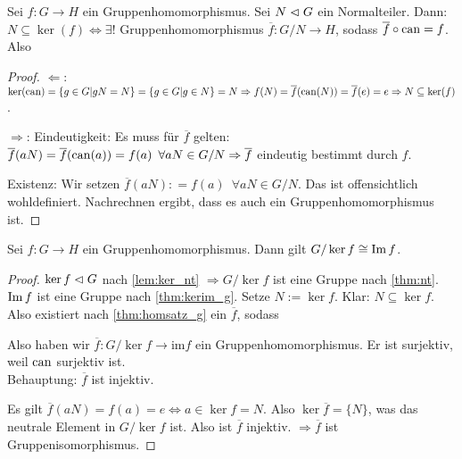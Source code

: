 \documentclass[12pt,a4paper]{scrartcl}
\begin{document}
\begin{satz}[Homomorphiesatz] \label{thm:homsatz_g}
	Sei $f\colon G\to H$ ein Gruppenhomomorphismus. Sei $N\vartriangleleft G$ ein Normalteiler. Dann: $N\subseteq \ker(f)\Leftrightarrow \exists!$ Gruppenhomomorphismus $\overline{f}\colon G/N\to H$, sodass $\overline{f}\circ \operatorname{can} = f$. Also 
	
	\begin{center}
	\end{center}
\end{satz}


\begin{proof}
	\glqq $\Leftarrow$\grqq: $\operatorname{ker}(\operatorname{can}) = \{g\in G|gN = N\} = \{g\in G|g\in N\} = N \Rightarrow f(N) = \overline{f}(\operatorname{can}(N)) = \overline{f}(e) = e\Rightarrow N\subseteq \operatorname{ker}(f)$.
	
	\noindent \glqq $\Rightarrow$\grqq: Eindeutigkeit: Es muss für $\overline{f}$ gelten: $\overline{f}(aN)=\overline{f}(\operatorname{can}(a)) = f(a)\enspace \forall aN\in G/N\Rightarrow \overline{f}$ eindeutig bestimmt durch $f$.
	
	Existenz: Wir setzen $\overline{f}(aN): = f(a)\enspace \forall aN\in G/N$. Das ist offensichtlich wohldefiniert. Nachrechnen ergibt, dass es auch ein Gruppenhomomorphismus ist.
\end{proof}

\begin{kor}
	Sei $f\colon G\to H$ ein Gruppenhomomorphismus. Dann gilt $G/\operatorname{ker} f \cong \operatorname{Im} f$.
\end{kor}
\begin{proof}
	$\operatorname{ker} f\vartriangleleft G$ nach \cref{lem:ker_nt} $\Rightarrow G/\ker f$ ist eine Gruppe nach \cref{thm:nt}. $\operatorname{Im} f$ ist eine Gruppe nach \cref{thm:kerim_g}. Setze $N:= \ker f$. Klar: $N\subseteq \ker f$. Also existiert nach \cref{thm:homsatz_g} ein $\overline{f}$, sodass
	
	\begin{center}
	\end{center}
	
	Also haben wir $\overline{f}\colon G/\ker f\to \mbox{im}f$ ein Gruppenhomomorphismus. Er ist surjektiv, weil $\operatorname{can}$ surjektiv ist. \\
	Behauptung: $\overline{f}$ ist injektiv.
	
	Es gilt $\overline{f}(aN)=f(a) = e \Leftrightarrow a\in \ker f = N$. Also $\ker \overline{f} = \{N\}$, was das neutrale Element in $G/\ker f$ ist. Also ist $\overline{f}$ injektiv. $\Rightarrow \overline{f}$ ist Gruppenisomorphismus.
\end{proof}
\end{document}
